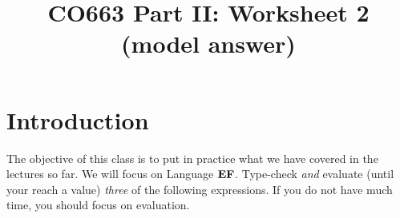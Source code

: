 \documentclass[11pt,landscape]{article}
\begin{document}
\title{CO663 Part II: Worksheet 2 (model answer)} 

\date{\vspace{-5ex}}
\maketitle


\newcommand{\answerbox}[1]{\framebox{\parbox[c][#1]{\textwidth}{
      \color{white}{h}%
    }}}


\section{Introduction}

The objective of this class is to put in practice what we have covered
in the lectures so far.
% 
We will focus on Language $\textbf{EF}$.
%
Type-check \emph{and} evaluate (until your reach a value)
\emph{three} of the following expressions.
%
If you do not have much time, you should focus on evaluation.
% 
% 




\end{document}
